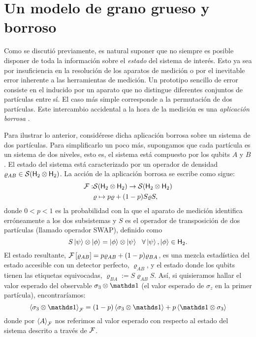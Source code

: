 \section{Un modelo de grano grueso y borroso}\label{sec:CH2CG}


Como se discutió previamente, es natural suponer que no siempre es posible disponer de toda la información sobre el \textit{estado} del sistema de interés. Esto ya sea por insuficiencia en la resolución de los aparatos de medición o por el inevitable error inherente a las herramientas de medición. Un prototipo sencillo de error consiste en el inducido por un aparato que no distingue diferentes conjuntos de partículas entre sí. El caso más simple corresponde a la permutación de dos partículas. Este intercambio accidental a la hora de la medición es una \textit{aplicación borrosa} \cite{FuzzyMeasurements}.

Para ilustrar lo anterior, considérese dicha aplicación borrosa sobre un sistema de dos partículas. Para simplificarlo un poco más, supongamos que cada partícula es un sistema de dos niveles, esto es, el sistema está compuesto por los qubits $A$ y $B$. El estado del sistema está caracterizado por un operador de densidad $\varrho_{AB} \in \mathcal{S}({\sf H}_2 \otimes {\sf H}_2)$. La acción de la aplicación borrosa se escribe como sigue:
\begin{align*}
\mathcal{F}:&\mathcal{S}({\sf H}_2 \otimes {\sf H}_2)\to \mathcal{S}({\sf H}_2 \otimes {\sf H}_2)\nonumber\\
&\varrho \mapsto p\varrho+(1-p)S\varrho S,
\end{align*}
donde $0<p<1$ es la probabilidad con la que el aparato de medición identifica erróneamente a los dos subsistemas y $S$ es el operador de transposición de dos partículas (llamado operador SWAP), definido como 
\begin{equation*}
    S\ket{\psi}\otimes \ket{\phi}=\ket{\phi}\otimes \ket{\psi} \ \ \forall \ket{\psi},\ket{\phi}\in {\sf H}_2.
\end{equation*}
El estado resultante, $\mathcal{F}\left[\varrho_{AB}\right]=p\varrho_{AB}+(1-p)\varrho_{BA}$, es una mezcla estadística del estado accesible con un detector perfecto, $\varrho_{AB}$, y el estado donde los qubits tienen las etiquetas equivocadas, $\varrho_{BA}:=S\varrho_{AB} S$. Así, si quisieramos hallar el valor esperado del observable $\sigma_{3}\otimes\Id$ (el valor esperado de $\sigma_{z}$ en la primer partícula), encontraríamos:
\begin{equation*}
    \expval{\sigma_{3}\otimes\Id}_{\mcF}=(1-p)\expval{\sigma_{3}\otimes\Id}+p\expval{\Id\otimes\sigma_{3}}
\end{equation*}
donde por $\expval{A}_{\mathcal{F}}$ nos referimos al valor esperado con respecto al estado del sistema descrito a través de $\mathcal{F}$.

